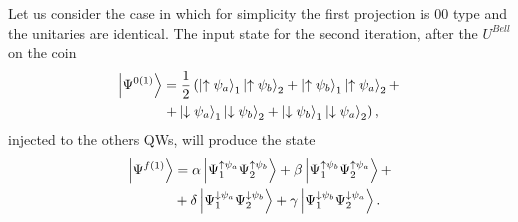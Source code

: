 \documentclass[
aps, pra, authorblock, superscriptaddress, twocolumn,
	10pt]{revtex4-1}
\begin{document}
Let us consider the case in which for simplicity the first projection is 00 type and the unitaries are identical. The input state for the second iteration, after the $U^{Bell}$ on the coin
\begin{align}
     \ket{\Psi^{0 (1)}} &= \frac{1}{2}\left(\ket{\uparrow \psi_a}_1 \ket{\uparrow \psi_b}_2 +\ket{\uparrow \psi_b}_1 \ket{\uparrow \psi_a}_2 + \right. \notag\\
      &\left. + \ket{\downarrow \psi_a}_1 \ket{\downarrow \psi_b}_2 +
     \ket{\downarrow \psi_b}_1 \ket{\downarrow \psi_a}_2
     \right),
\end{align}
injected to the others QWs, will produce the state
\begin{align}
     \ket{\Psi^{f(1)}} &=
     \alpha \ket{\Psi^{\uparrow \psi_a}_1\Psi^{\uparrow \psi_b}_2} +
     \beta \ket{\Psi^{\uparrow \psi_b}_1\Psi^{\uparrow \psi_a}_2} +  \notag \\
        &+ \delta \ket{\Psi^{\downarrow \psi_a}_1\Psi^{\downarrow \psi_b}_2} 
         + \gamma \ket{\Psi^{\downarrow \psi_b}_1\Psi^{\downarrow \psi_a}_2}.
\label{eq:final_state1}                 
\end{align}
\end{document}
